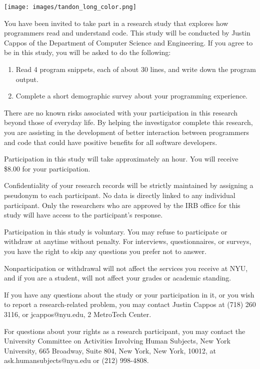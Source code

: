 \documentclass[12pt, a4paper, oneside]{article}
\begin{document}
\thispagestyle{empty}

\texttt{[image: images/tandon\_long\_color.png]}

\vspace{20pt}

You have been invited to take part in a research study that explores
how programmers read and understand code. This study will be conducted
by Justin Cappos of the Department of Computer Science and Engineering.
If you agree to be in this study, you will be asked to do the
following:

\begin{enumerate}
\item
  {Read 4 program snippets, each of about 30 lines, and write down the
  program output.}
\item
  {Complete a short demographic survey about your programming
  experience.}
\end{enumerate}

There are no known risks associated with your participation in this
research beyond those of everyday life. By helping the investigator
complete this research, you are assisting in the development of better
interaction between programmers and code that could have positive
benefits for all software developers.

Participation in this study will take approximately an hour. You
will receive \$8.00 for your participation.

Confidentiality of your research records will be strictly maintained by
assigning a pseudonym to each participant. No data is directly linked to
any individual participant. Only the researchers who are approved by the
IRB office for this study will have access to the participant's
response.

Participation in this study is voluntary. You may refuse to participate
or withdraw at anytime without penalty. For interviews, questionnaires,
or surveys, you have the right to skip any questions you prefer not to
answer.

Nonparticipation or withdrawal will not affect the services you receive
at NYU, and if you are a student, will not affect your grades or
academic standing.

If you have any questions about the study or your participation in it,
or you wish to report a research-related problem, you may contact Justin
Cappos at (718) 260 3116, or jcappos@nyu.edu, 2 MetroTech Center.

For questions about your rights as a research participant, you may
contact the University Committee on Activities Involving Human Subjects,
New York University, 665 Broadway, Suite 804, New York, New York, 10012,
at ask.humansubjects@nyu.edu or (212) 998-4808.
\end{document}
